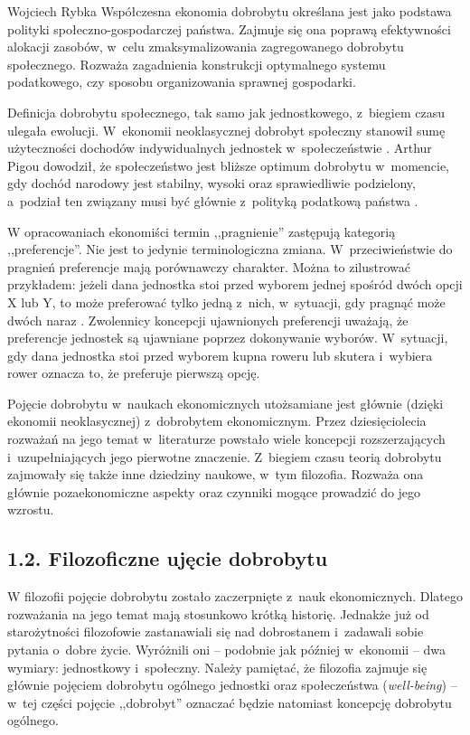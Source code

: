 \begin{artplenv}{Wojciech Rybka}
Współczesna ekonomia dobrobytu określana jest jako podstawa polityki społeczno-gospodarczej państwa. Zajmuje się ona
poprawą efektywności alokacji zasobów, w~celu zmaksymalizowania zagregowanego dobrobytu społecznego. Rozważa
zagadnienia konstrukcji optymalnego systemu podatkowego, czy sposobu organizowania sprawnej gospodarki.

Definicja dobrobytu społecznego, tak samo jak jednostkowego, z~biegiem czasu ulegała ewolucji. W~ekonomii neoklasycznej
dobrobyt społeczny stanowił sumę użyteczności dochodów indywidualnych jednostek w~społeczeństwie
\parencite{zaremba_dobrobyt_2016}.
Arthur Pigou dowodził, że społeczeństwo jest bliższe optimum
dobrobytu w~momencie, gdy dochód narodowy jest stabilny, wysoki oraz sprawiedliwie podzielony, a~podział ten związany musi być
głównie z~polityką podatkową państwa
\parencite{zaremba_dobrobyt_2016}.

W opracowaniach ekonomiści termin ,,pragnienie'' zastępują kategorią ,,preferencje''. Nie jest to jedynie terminologiczna
zmiana. W~przeciwieństwie do pragnień preferencje mają porównawczy charakter. Można to zilustrować przykładem: jeżeli
dana jednostka stoi przed wyborem jednej spośród dwóch opcji X lub Y, to może preferować tylko jedną z~nich,
w~sytuacji, gdy pragnąć może dwóch naraz
\parencite{kwarcinski_koncepcje_2016}.
Zwolennicy koncepcji ujawnionych
preferencji uważają, że preferencje jednostek są ujawniane poprzez dokonywanie wyborów. W~sytuacji, gdy dana jednostka
stoi przed wyborem kupna roweru lub skutera i~wybiera rower oznacza to, że preferuje pierwszą opcję. 

Pojęcie dobrobytu w~naukach ekonomicznych utożsamiane jest głównie (dzięki ekonomii neoklasycznej) z~dobrobytem
ekonomicznym. Przez dziesięciolecia rozważań na jego temat w~literaturze powstało wiele koncepcji
rozszerzających i~uzupełniających jego pierwotne znaczenie. Z~biegiem czasu teorią dobrobytu
zajmowały się także inne dziedziny naukowe, w~tym filozofia. Rozważa ona głównie pozaekonomiczne
aspekty oraz czynniki mogące prowadzić do jego wzrostu. 

\subsection{1.2. Filozoficzne ujęcie dobrobytu}
W filozofii pojęcie dobrobytu zostało zaczerpnięte z~nauk ekonomicznych. Dlatego rozważania na jego temat mają
stosunkowo krótką historię. Jednakże już od starożytności filozofowie zastanawiali się nad dobrostanem i~zadawali sobie
pytania o~dobre życie. Wyróżnili oni -- podobnie jak później w~ekonomii -- dwa wymiary: jednostkowy i~społeczny. Należy
pamiętać, że filozofia zajmuje się głównie pojęciem dobrobytu ogólnego jednostki oraz społeczeństwa
(\textit{well-being}) -- w~tej części pojęcie ,,dobrobyt'' oznaczać będzie natomiast koncepcję dobrobytu ogólnego. 


\end{artplenv}
